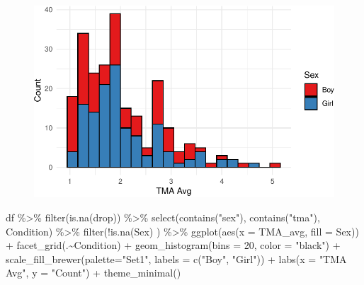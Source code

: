 \documentclass[
  letterpaper,
  DIV=11,
  numbers=noendperiod]{scrartcl}
\newenvironment{Shaded}{\begin{snugshade}}{\end{snugshade}}
\newcommand{\AttributeTok}[1]{\textcolor[rgb]{0.40,0.45,0.13}{#1}}
\newcommand{\DecValTok}[1]{\textcolor[rgb]{0.68,0.00,0.00}{#1}}
\newcommand{\FunctionTok}[1]{\textcolor[rgb]{0.28,0.35,0.67}{#1}}
\newcommand{\NormalTok}[1]{\textcolor[rgb]{0.00,0.23,0.31}{#1}}
\newcommand{\SpecialCharTok}[1]{\textcolor[rgb]{0.37,0.37,0.37}{#1}}
\newcommand{\StringTok}[1]{\textcolor[rgb]{0.13,0.47,0.30}{#1}}
\begin{document}
\begin{figure}[H]

{\centering \includegraphics{mathAnx_eda1_files/figure-pdf/unnamed-chunk-3-1.pdf}

}

\end{figure}

\begin{Shaded}
\begin{Highlighting}[]
\NormalTok{df }\SpecialCharTok{\%\textgreater{}\%}  \FunctionTok{filter}\NormalTok{(}\FunctionTok{is.na}\NormalTok{(drop)) }\SpecialCharTok{\%\textgreater{}\%} 
  \FunctionTok{select}\NormalTok{(}\FunctionTok{contains}\NormalTok{(}\StringTok{"sex"}\NormalTok{), }\FunctionTok{contains}\NormalTok{(}\StringTok{"tma"}\NormalTok{), Condition) }\SpecialCharTok{\%\textgreater{}\%} 
  \FunctionTok{filter}\NormalTok{(}\SpecialCharTok{!}\FunctionTok{is.na}\NormalTok{(Sex) ) }\SpecialCharTok{\%\textgreater{}\%} 
  \FunctionTok{ggplot}\NormalTok{(}\FunctionTok{aes}\NormalTok{(}\AttributeTok{x =}\NormalTok{ TMA\_avg, }\AttributeTok{fill =}\NormalTok{ Sex)) }\SpecialCharTok{+}
  \FunctionTok{facet\_grid}\NormalTok{(.}\SpecialCharTok{\textasciitilde{}}\NormalTok{Condition) }\SpecialCharTok{+}
  \FunctionTok{geom\_histogram}\NormalTok{(}\AttributeTok{bins =} \DecValTok{20}\NormalTok{, }\AttributeTok{color =} \StringTok{"black"}\NormalTok{) }\SpecialCharTok{+}
  \FunctionTok{scale\_fill\_brewer}\NormalTok{(}\AttributeTok{palette=}\StringTok{"Set1"}\NormalTok{, }\AttributeTok{labels =} 
                      \FunctionTok{c}\NormalTok{(}\StringTok{"Boy"}\NormalTok{, }\StringTok{"Girl"}\NormalTok{)) }\SpecialCharTok{+}
  \FunctionTok{labs}\NormalTok{(}\AttributeTok{x =} \StringTok{"TMA Avg"}\NormalTok{, }\AttributeTok{y =} \StringTok{"Count"}\NormalTok{) }\SpecialCharTok{+}
  \FunctionTok{theme\_minimal}\NormalTok{() }
\end{Highlighting}
\end{Shaded}
\end{document}
